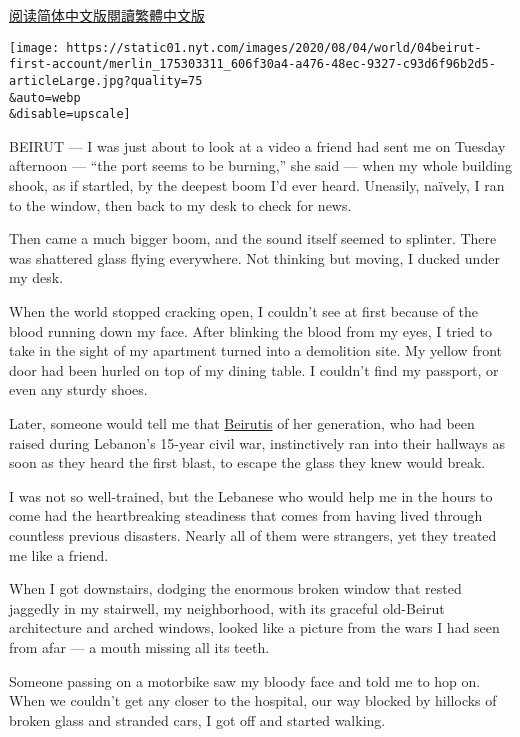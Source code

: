 \href{https://cn.nytimes.com/world/20200805/beirut-explosion-first-person/}{阅读简体中文版}\href{https://cn.nytimes.com/world/20200805/beirut-explosion-first-person/zh-hant/}{閱讀繁體中文版}

\texttt{[image: https://static01.nyt.com/images/2020/08/04/world/04beirut-first-account/merlin\_175303311\_606f30a4-a476-48ec-9327-c93d6f96b2d5-articleLarge.jpg?quality=75\\\&auto=webp\\\&disable=upscale]}

BEIRUT --- I was just about to look at a video a friend had sent me on
Tuesday afternoon --- ``the port seems to be burning,'' she said ---
when my whole building shook, as if startled, by the deepest boom I'd
ever heard. Uneasily, naïvely, I ran to the window, then back to my desk
to check for news.

Then came a much bigger boom, and the sound itself seemed to splinter.
There was shattered glass flying everywhere. Not thinking but moving, I
ducked under my desk.

When the world stopped cracking open, I couldn't see at first because of
the blood running down my face. After blinking the blood from my eyes, I
tried to take in the sight of my apartment turned into a demolition
site. My yellow front door had been hurled on top of my dining table. I
couldn't find my passport, or even any sturdy shoes.

Later, someone would tell me that
\href{https://www.nytimes.com/2020/08/04/world/middleeast/lebanon-explosion-beirut.html}{Beirutis}
of her generation, who had been raised during Lebanon's 15-year civil
war, instinctively ran into their hallways as soon as they heard the
first blast, to escape the glass they knew would break.

I was not so well-trained, but the Lebanese who would help me in the
hours to come had the heartbreaking steadiness that comes from having
lived through countless previous disasters. Nearly all of them were
strangers, yet they treated me like a friend.

When I got downstairs, dodging the enormous broken window that rested
jaggedly in my stairwell, my neighborhood, with its graceful old-Beirut
architecture and arched windows, looked like a picture from the wars I
had seen from afar --- a mouth missing all its teeth.

Someone passing on a motorbike saw my bloody face and told me to hop on.
When we couldn't get any closer to the hospital, our way blocked by
hillocks of broken glass and stranded cars, I got off and started
walking.

